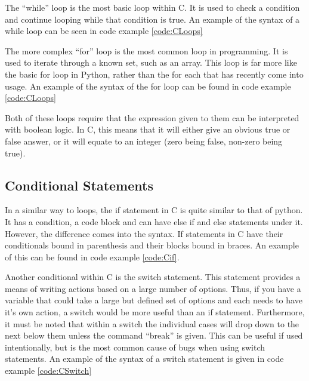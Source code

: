 			The ``while'' loop is the most basic loop within C. 
			It is used to check a condition and continue looping while that condition is true. 
			An example of the syntax of a while loop can be seen in code example \ref{code:CLoops}

			The more complex ``for'' loop is the most common loop in programming. 
			It is used to iterate through a known set, such as an array. 
			This loop is far more like the basic for loop in Python, rather than the for each that has recently come into usage. 
			An example of the syntax of the for loop can be found in code example \ref{code:CLoops}
			
			Both of these loops require that the expression given to them can be interpreted with boolean logic. 
			In C, this means that it will either give an obvious true or false answer, or it will equate to an integer (zero being false, non-zero being true).

			\begin{code}
				C}]{./CLoops.c}
				\caption{Examples of Basic C Loops}
				\label{code:CLoops}
			\end{code}
		\subsection{Conditional Statements}
			In a similar way to loops, the if statement in C is quite similar to that of python. 
			It has a condition, a code block and can have else if and else statements under it. 
			However, the difference comes into the syntax. 
			If statements in C have their conditionals bound in parenthesis and their blocks bound in braces. 
			An example of this can be found in code example \ref{code:Cif}.

			\begin{code}
				C}]{./if.c}
				\caption{Example of the C if statement}
				\label{code:Cif}
			\end{code}

			Another conditional within C is the switch statement. 
			This statement provides a means of writing actions based on a large number of options. 
			Thus, if you have a variable that could take a large but defined set of options and each needs to have it's own action, a switch would be more useful than an if statement. 
			Furthermore, it must be noted that within a switch the individual cases will drop down to the next below them unless the command ``break'' is given. 
			This can be useful if used intentionally, but is the most common cause of bugs when using switch statements. 
			An example of the syntax of a switch statement is given in code example \ref{code:CSwitch}

